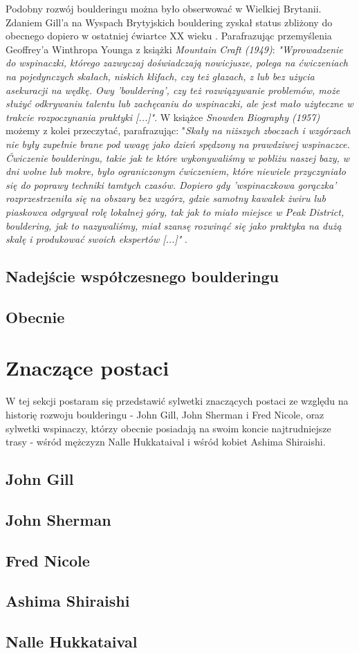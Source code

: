 \documentclass{article}
\begin{document}
Podobny rozwój boulderingu można było obserwować w Wielkiej Brytanii. Zdaniem Gill'a na Wyspach Brytyjskich bouldering zyskał status zbliżony do obecnego dopiero w ostatniej ćwiartce XX wieku \cite{gill-history-1.2}. Parafrazując przemyślenia Geoffrey'a Winthropa Younga z książki \textit{Mountain Craft (1949)}: \textit{"Wprowadzenie do wspinaczki, którego zazwyczaj doświadczają nowicjusze, polega na ćwiczeniach na pojedynczych skałach, niskich klifach, czy też głazach, z lub bez użycia asekuracji na wędkę. Owy 'bouldering', czy też rozwiązywanie problemów, może służyć odkrywaniu talentu lub zachęcaniu do wspinaczki, ale jest mało użyteczne w trakcie rozpoczynania praktyki [...]"}. W książce \textit{Snowden Biography (1957)} możemy z kolei przeczytać, parafrazując: "\textit{Skały na niższych zboczach i wzgórzach nie były zupełnie brane pod uwagę jako dzień spędzony na prawdziwej wspinaczce. Ćwiczenie boulderingu, takie jak te które wykonywaliśmy w pobliżu naszej bazy, w dni wolne lub mokre, było ograniczonym ćwiczeniem, które niewiele przyczyniało się do poprawy techniki tamtych czasów. Dopiero gdy 'wspinaczkowa gorączka' rozprzestrzeniła się na obszary bez wzgórz, gdzie samotny kawałek żwiru lub piaskowca odgrywał rolę lokalnej góry, tak jak to miało miejsce w Peak District, bouldering, jak to nazywaliśmy, miał szansę rozwinąć się jako praktyka na dużą skalę i produkować swoich ekspertów [...]"} \cite{gill-history-1.2}.

\subsection{Nadejście współczesnego boulderingu}


\subsection{Obecnie}

\section{Znaczące postaci}
\lettrine[lines=2]{W}{} tej sekcji postaram się przedstawić sylwetki znaczących postaci ze względu na historię rozwoju boulderingu - John Gill, John Sherman i Fred Nicole, oraz sylwetki wspinaczy, którzy obecnie posiadają na swoim koncie najtrudniejsze trasy - wśród mężczyzn Nalle Hukkataival i wśród kobiet Ashima Shiraishi. 

\subsection{John Gill}
\label{jg}
\subsection{John Sherman}
\subsection{Fred Nicole}
\subsection{Ashima Shiraishi}
\subsection{Nalle Hukkataival}

\nocite{*}
\printbibliography
\end{document}
